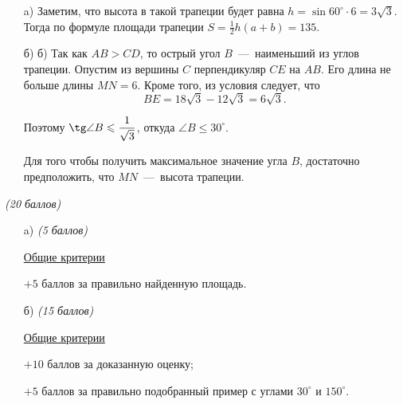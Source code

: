 \solutionSection
\begin{enumerate}
    \item[a)] Заметим, что высота в такой трапеции
        будет равна $h = \sin{60^\circ} \cdot 6 = 3\sqrt{3}$. Тогда по
        формуле площади трапеции $S = \frac{1}{2}h(a+b) = 135$.
        
    \item[б)]    б) Так как $AB > CD$, то острый угол $B$~---~наименьший из углов трапеции.
        Опустим из вершины $C$ перпендикуляр $CE$ на $AB$. Его длина не больше длины $MN = 6$.
        Кроме того, из условия следует, что 
        $$BE = 18\sqrt{3} - 12\sqrt{3} = 6\sqrt{3}.$$
        
        Поэтому $\tg\angle B \leqslant \dfrac{1}{\sqrt{3}}$, откуда $\angle B \leqslant 30^\circ$.	

        Для того чтобы получить максимальное значение угла $B$, достаточно предположить, что $MN$~---~высота трапеции.   
\end{enumerate}


\additionalCriteria

\textit{(20 баллов)}
\begin{enumerate}
    \item[a)] \textit{(5 баллов)} 

	\underline{Общие критерии}

	$+5$ баллов за правильно найденную площадь.

	\item[б)] \textit{(15 баллов)} 
	
	\underline{Общие критерии}

	$+10$ баллов за доказанную оценку;
	
	$+5$ баллов за правильно подобранный пример с углами $30^{\circ}$ и $150^{\circ}$.
\end{enumerate}	
